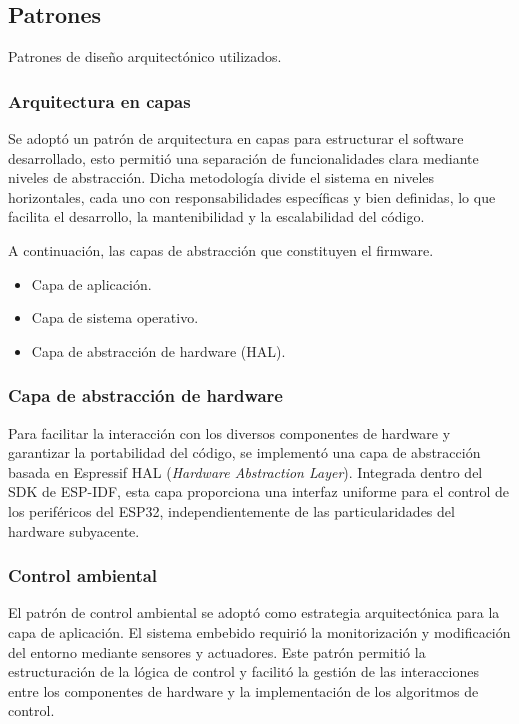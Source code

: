 \subsection{Patrones}

Patrones de diseño arquitectónico utilizados.

\subsubsection{Arquitectura en capas}
Se adoptó un patrón de arquitectura en capas para estructurar el software desarrollado, esto permitió una separación de funcionalidades clara mediante niveles de abstracción. Dicha metodología divide el sistema en niveles horizontales, cada uno con responsabilidades específicas y bien definidas, lo que facilita el desarrollo, la mantenibilidad y la escalabilidad del código.

A continuación, las capas de abstracción que constituyen el firmware.

\begin{itemize}
	\item Capa de aplicación.
	\item Capa de sistema operativo.
	\item Capa de abstracción de hardware (HAL).
\end{itemize}


\subsubsection{Capa de abstracción de hardware}

Para facilitar la interacción con los diversos componentes de hardware y garantizar la portabilidad del código, se implementó una capa de abstracción basada en Espressif HAL (\textit{Hardware Abstraction Layer}). Integrada dentro del SDK de ESP-IDF, esta capa proporciona una interfaz uniforme para el control de los periféricos del ESP32, independientemente de las particularidades del hardware subyacente.

\subsubsection{Control ambiental}

El patrón de control ambiental se adoptó como estrategia arquitectónica para la capa de aplicación. El sistema embebido requirió la monitorización y modificación del entorno mediante sensores y actuadores. Este patrón permitió la estructuración de la lógica de control y facilitó la gestión de las interacciones entre los componentes de hardware y la implementación de los algoritmos de control.

